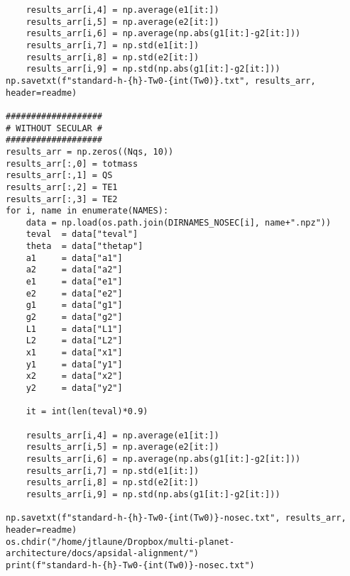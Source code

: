 \documentclass[11pt]{article}
\begin{document}
\begin{verbatim}
    results_arr[i,4] = np.average(e1[it:])
    results_arr[i,5] = np.average(e2[it:])
    results_arr[i,6] = np.average(np.abs(g1[it:]-g2[it:]))
    results_arr[i,7] = np.std(e1[it:])
    results_arr[i,8] = np.std(e2[it:])
    results_arr[i,9] = np.std(np.abs(g1[it:]-g2[it:]))
np.savetxt(f"standard-h-{h}-Tw0-{int(Tw0)}.txt", results_arr, header=readme)

###################
# WITHOUT SECULAR #
###################
results_arr = np.zeros((Nqs, 10))
results_arr[:,0] = totmass
results_arr[:,1] = QS
results_arr[:,2] = TE1
results_arr[:,3] = TE2
for i, name in enumerate(NAMES):
    data = np.load(os.path.join(DIRNAMES_NOSEC[i], name+".npz"))
    teval  = data["teval"]
    theta  = data["thetap"]
    a1     = data["a1"]
    a2     = data["a2"]
    e1     = data["e1"]
    e2     = data["e2"]
    g1     = data["g1"]
    g2     = data["g2"]
    L1     = data["L1"]
    L2     = data["L2"]
    x1     = data["x1"]
    y1     = data["y1"]
    x2     = data["x2"]
    y2     = data["y2"]

    it = int(len(teval)*0.9)

    results_arr[i,4] = np.average(e1[it:])
    results_arr[i,5] = np.average(e2[it:])
    results_arr[i,6] = np.average(np.abs(g1[it:]-g2[it:]))
    results_arr[i,7] = np.std(e1[it:])
    results_arr[i,8] = np.std(e2[it:])
    results_arr[i,9] = np.std(np.abs(g1[it:]-g2[it:]))

np.savetxt(f"standard-h-{h}-Tw0-{int(Tw0)}-nosec.txt", results_arr, header=readme)
os.chdir("/home/jtlaune/Dropbox/multi-planet-architecture/docs/apsidal-alignment/")
print(f"standard-h-{h}-Tw0-{int(Tw0)}-nosec.txt")
\end{verbatim}
\end{document}

